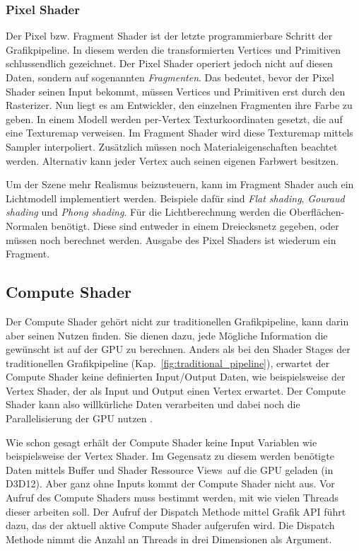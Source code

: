 \subsubsection{Pixel Shader}
\label{subsubsec:pixel_shader}
Der Pixel bzw. Fragment Shader ist der letzte programmierbare Schritt der Grafikpipeline.
In diesem werden die transformierten Vertices und Primitiven schlussendlich gezeichnet.
Der Pixel Shader operiert jedoch nicht auf diesen Daten, sondern auf sogenannten \textit{Fragmenten}.
Das bedeutet, bevor der Pixel Shader seinen Input bekommt, müssen Vertices und Primitiven erst durch den Rasterizer.
Nun liegt es am Entwickler, den einzelnen Fragmenten ihre Farbe zu geben.
In einem Modell werden per-Vertex Texturkoordinaten gesetzt, die auf eine Texturemap verweisen.
Im Fragment Shader wird diese Texturemap mittels Sampler interpoliert.
Zusätzlich müssen noch Materialeigenschaften beachtet werden.
Alternativ kann jeder Vertex auch seinen eigenen Farbwert besitzen. \newline

Um der Szene mehr Realismus beizusteuern, kann im Fragment Shader auch ein Lichtmodell implementiert werden.
Beispiele dafür sind \textit{Flat shading}, \textit{Gouraud shading} und \textit{Phong shading}.
Für die Lichtberechnung werden die Oberflächen-Normalen benötigt.
Diese sind entweder in einem Dreiecksnetz gegeben, oder müssen noch berechnet werden.
Ausgabe des Pixel Shaders ist wiederum ein Fragment.

\subsection{Compute Shader}
\label{subsec:compute_shader}
Der Compute Shader gehört nicht zur traditionellen Grafikpipeline, kann darin aber seinen Nutzen finden.
Sie dienen dazu, jede Mögliche Information die gewünscht ist auf der GPU zu berechnen.
Anders als bei den Shader Stages der traditionellen Grafikpipeline (Kap.~\ref{fig:traditional_pipeline}), erwartet der Compute Shader keine definierten Input/Output Daten, wie beispielsweise der Vertex Shader, der als Input und Output einen Vertex erwartet.
Der Compute Shader kann also willkürliche Daten verarbeiten und dabei noch die Parallelisierung der GPU nutzen \cite{Compute24}. \newline

Wie schon gesagt erhält der Compute Shader keine Input Variablen wie beispielsweise der Vertex Shader.
Im Gegensatz zu diesem werden benötigte Daten mittels Buffer und \glqq Shader Ressource Views\grqq\ auf die GPU geladen (in D3D12).
Aber ganz ohne Inputs kommt der Compute Shader nicht aus.
Vor Aufruf des Compute Shaders muss bestimmt werden, mit wie vielen Threads dieser arbeiten soll.
Der Aufruf der Dispatch Methode mittel Grafik API führt dazu, das der aktuell aktive Compute Shader aufgerufen wird.
Die Dispatch Methode nimmt die Anzahl an Threads in drei Dimensionen als Argument.

